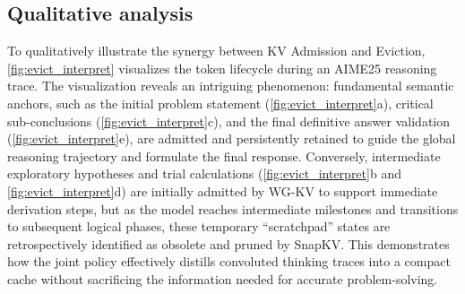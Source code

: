 \subsection{Qualitative analysis}

To qualitatively illustrate the synergy between KV Admission and Eviction, \cref{fig:evict_interpret} visualizes the token lifecycle during an AIME25 reasoning trace. The visualization reveals an intriguing phenomenon: fundamental semantic anchors, such as the initial problem statement (\cref{fig:evict_interpret}a), critical sub-conclusions (\cref{fig:evict_interpret}c), and the final definitive answer validation (\cref{fig:evict_interpret}e), are admitted and persistently retained to guide the global reasoning trajectory and formulate the final response. Conversely, intermediate exploratory hypotheses and trial calculations (\cref{fig:evict_interpret}b and \cref{fig:evict_interpret}d) are initially admitted by WG-KV to support immediate derivation steps, but as the model reaches intermediate milestones and transitions to subsequent logical phases, these temporary ``scratchpad'' states are retrospectively identified as obsolete and pruned by SnapKV. This demonstrates how the joint policy effectively distills convoluted thinking traces into a compact cache without sacrificing the information needed for accurate problem-solving.

